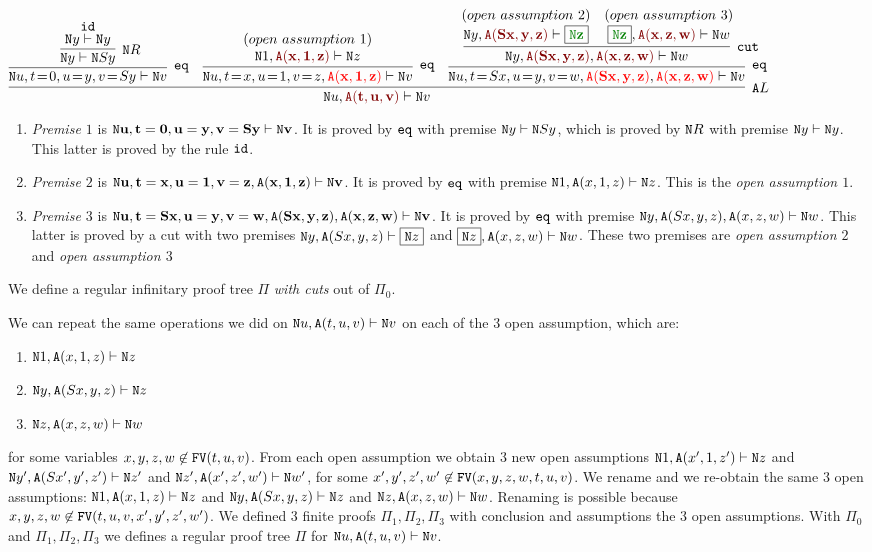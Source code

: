 \documentclass[a4paper,12pt]{article}
\newenvironment{proof}[1][Proof]{\begin{trivlist}
\item[\hskip \labelsep {\bfseries #1}]}{\end{trivlist}}
\newcommand{\Nat}               { {\tt N}  }
\newcommand{\FV}              { {\tt FV} }
\newcommand{\id}              { {\tt id} }
\newcommand{\eq}              { {\tt eq} }
\newcommand{\Ack}   {{\tt A}}
\begin{document}
\begin{proof}
\begin{center}
{\scriptsize
$
\infer[\Ack L] 
 {\Nat u, {\redStat{ \Ack(t,u,v) }} \vdash \Nat v}
 {
   \firstPremiseAckL
 & 
   \secondPremiseAckL
 &
   \thirdPremiseAckL
 }
$
}
\end{center}

\begin{enumerate}
\item
\emph{Premise $1$} is $\mathbf{\Nat u, t=0, u=y, v=Sy \vdash \Nat v}$. 
It is proved by $\eq$ with premise $\Nat y \vdash \Nat Sy$, 
which is proved by $\Nat R$ with premise 
$\Nat y \vdash \Nat y$. This latter is proved by the rule $\id$. 

\item
\emph{Premise $2$} is $\mathbf{\Nat u, t=x, u=1, v=z, \Ack(x,1,z) \vdash \Nat v}$. 
It is proved by $\eq$ with premise $\Nat 1, \Ack(x,1,z) \vdash \Nat z$. This is the 
\emph{open assumption $1$}.

\item
\emph{Premise $3$} is 
$\mathbf{\Nat u, t=Sx, u=y, v=w, \Ack(Sx,y,z), \Ack(x,z,w) \vdash \Nat v}$. 
It is proved by $\eq$ with premise $\Nat y,  \Ack(Sx,y,z), \Ack(x,z,w) \vdash \Nat w$. 
This latter is proved by a cut with two premises $\Nat y,  \Ack(Sx,y,z) \vdash \boxed{\Nat z}$ 
and $\boxed{\Nat z}, \Ack(x,z,w) \vdash \Nat w$. These  two premises are 
\emph{open assumption $2$} and \emph{open assumption $3$}
\end{enumerate}

We define a regular infinitary proof tree $\Pi$ \emph{with cuts} out of $\Pi_0$. 

We can repeat the same operations we did on $\Nat u, \Ack(t,u,v) \vdash \Nat v$ 
on each of the $3$ open assumption, which are:

\begin{enumerate}
\item
$\Nat 1, \Ack(x,1,z) \vdash \Nat z$
\item
$\Nat y, \Ack(Sx,y,z) \vdash \Nat z$
\item
$\Nat z, \Ack(x,z,w) \vdash \Nat w$
\end{enumerate} 

for some variables $x, y, z, w\not \in \FV(t,u,v)$.
From each open assumption we obtain $3$ new open assumptions $\Nat 1, \Ack(x',1,z') \vdash 
\Nat z$ and $\Nat y', \Ack(Sx',y',z') \vdash \Nat z'$ and $\Nat z', \Ack(x',z',w') \vdash \Nat w'$, 
for some $x', y', z', w' \not \in \FV(x,y,z,w,t,u,v)$. We rename and we re-obtain the same 
$3$ open assumptions: $\Nat 1, \Ack(x,1,z) \vdash \Nat z$ and $\Nat y, \Ack(Sx,y,z) \vdash \Nat 
z$ and $\Nat z, \Ack(x,z,w) \vdash \Nat w$.
Renaming is possible because $x, y, z, w\not \in \FV(t,u,v,x',y',z',w')$.  
We defined 3 finite proofs $\Pi_1, \Pi_2, \Pi_3$
with conclusion and assumptions the 3 open assumptions.
With $\Pi_0$ and $\Pi_1, \Pi_2, \Pi_3$ we defines 
a regular proof tree $\Pi$ for $\Nat u, \Ack(t,u,v) \vdash \Nat v$.
\\


\end{proof}
\end{document}
